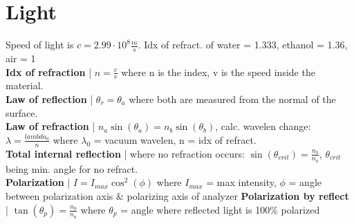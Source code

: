 \documentclass{article}
\begin{document}
\section{Light}
\vspace{-2mm}
Speed of light is $c = 2.99 \cdot 10^8 \frac{m}{s}$. Idx of refract. of water = 1.333, ethanol = 1.36, air = 1 \\
\textbf{Idx of refraction} | $n = \frac{c}{v}$ where n is the index, v is the speed inside the material. \\
\textbf{Law of reflection} | $\theta_r = \theta_a$ where both are measured from the normal of the surface. \\
\textbf{Law of refraction} | $n_a\sin{(\theta_a)} = n_b\sin{(\theta_b)}$, calc. wavelen change: $\lambda = \frac{lambda_0}{n}$ where $\lambda_0$ = vacuum wavelen, n = idx of refract. \\
\textbf{Total internal reflection} | where no refraction occurs: $\sin{(\theta_{crit})} = \frac{n_b}{n_a}$, $\theta_{crit}$ being min. angle for no refract. \\
\textbf{Polarization} | $I = I_{max}\cos^2{(\phi)}$ where $I_{max}$ = max intensity, $\phi$ = angle between polarization axis \& polarizing axis of analyzer
\textbf{Polarization by reflect} | $\tan{(\theta_p)} = \frac{n_b}{n_a}$ where $\theta_p$ = angle where reflected light is 100\% polarized \\
\vspace{-5mm}
\end{document}
